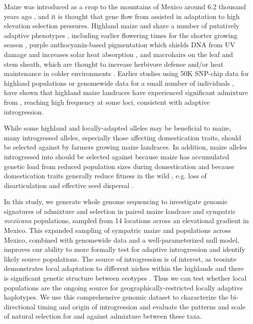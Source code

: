 Maize was introduced as a crop to the mountains of Mexico around 6.2 thousand years ago \cite{Piperno:2001_highlands}, and it is thought that gene flow from \mexicana assisted in adaptation to high elevation selection pressures. 
Highland maize and \mexicana share a number of putatively adaptive phenotypes \cite{Wilkes:1967, Wilkes:1977vc}, including earlier flowering times for the shorter growing season \cite{Rodriguez:2006_flowering}, purple anthocyanin-based pigmentation which shields DNA from UV damage \cite{Stapleton_Walbot:1994_anthocyanin_uv} and increases solar heat absorption \cite{Barthakur:1974_anthocyanin}, and macrohairs on the leaf and stem sheath, which are thought to increase herbivore defense \cite{Moya-Raygoza:2016} and/or heat maintenance in colder environments \cite{Lauter:2004}.
Earlier studies using 50K SNP-chip data for highland populations \cite{Hufford:2013_crop_wild} or genomewide data for a small number of individuals \cite{Wang:2017, Gonzalez-Segovia:2019}, have shown that highland maize landraces have experienced significant admixture from \mexicana, reaching high frequency at some loci, consistent with adaptive introgression. 


While some highland and locally-adapted alleles may be beneficial to maize, many introgressed \mexicana alleles, especially those affecting domestication traits, should be selected against by farmers growing maize landraces. In addition, maize alleles introgressed into \mexicana should be selected against because maize has accumulated genetic load from reduced population sizes during domestication \cite{Wang:2017} and because domestication traits generally reduce fitness in the wild \cite{Meyer_Purugganan:2013_crops, Stitzer_Ibarra:2018, Doebley:2004}, e.g. loss of disarticulation and effective seed dispersal \cite{Wilkes:1967}. 



In this study, we generate whole genome sequencing to investigate genomic signatures of admixture and selection in paired maize landrace and sympatric \textit{mexicana} populations, sampled from 14 locations across an elevational gradient in Mexico. This expanded sampling of sympatric maize and \mexicana populations across Mexico, combined with genomewide data and a well-parameterized null model, improves our ability to more formally test for adaptive introgression and identify likely source populations. The source of introgression is of interest, as teosinte demonstrates local adaptation to different niches within the highlands and there is significant genetic structure between \mexicana ecotypes \cite{Wilkes:1967, Fukunaga:2005fx, Pyhajarvi:2013jc, Fustier:2017, OBrien:2019}. Thus we can test whether local \mexicana populations are the ongoing source for geographically-restricted locally adaptive haplotypes.
We use this comprehensive genomic dataset to characterize the bi-directional timing and origin of introgression and evaluate the patterns and scale of natural selection for and against admixture between these taxa. 

